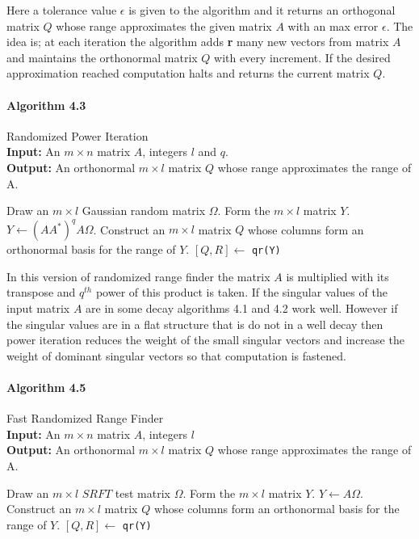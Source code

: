 \documentclass[11pt,a4paper]{article}
\theoremstyle{definition}
\begin{document}
	Here a tolerance value $\epsilon$ is given to the algorithm and it returns an orthogonal matrix $Q$ whose range approximates the given matrix $A$ with an max error $\epsilon$. The idea is; at each iteration the algorithm adds \textbf{r} many new vectors from matrix $A$ and maintains the orthonormal matrix $Q$ with every increment. If the desired approximation reached computation halts and returns the current matrix $Q$.
	 
	\paragraph{Algorithm 4.3} Randomized Power Iteration \\
	\textbf{Input:} An $m \times n$ matrix $A$, integers $l$ and $q$. \\
	\textbf{Output:} An orthonormal $m \times l$ matrix $Q$ whose range approximates the range of A.
	\begin{algorithmic}[1]
		\State Draw an $m \times l$ Gaussian random matrix $ \Omega$.
		\State Form the $m \times l$ matrix $Y$. $Y \gets	 (AA^*)^qA\Omega $.
		\State Construct an $m \times l$ matrix $Q$ whose columns form an orthonormal basis for the range of $Y$. $[Q, R] \gets$ \texttt{qr(Y)}
	\end{algorithmic}

	In this version of randomized range finder the matrix $A$ is multiplied with its transpose and $q^{th}$ power of this product is taken. If the singular values of the input matrix $A$ are in some decay algorithms 4.1 and 4.2 work well. However if the singular values are in a flat structure that is do not in a well decay then power iteration reduces the weight of the small singular vectors and increase the weight of dominant singular vectors so that computation is fastened.
	
	
	\paragraph{Algorithm 4.5} Fast Randomized Range Finder \\
	\textbf{Input:} An $m \times n$ matrix $A$, integers $l$\\
	\textbf{Output:} An orthonormal $m \times l$ matrix $Q$ whose range approximates the range of A.
	\begin{algorithmic}[1]
		\State Draw an $m \times l$ $SRFT$ test matrix $\Omega$.
		\State Form the $m \times l$ matrix $Y$. $Y \gets	 A \Omega $.
		\State Construct an $m \times l$ matrix $Q$ whose columns form an orthonormal basis for the range of $Y$. $[Q, R] \gets$ \texttt{qr(Y)}
	\end{algorithmic}
\end{document}

